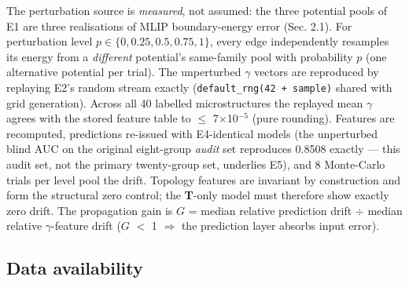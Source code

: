 \documentclass[11pt]{article}
\begin{document}
The perturbation source is \textit{measured}, not assumed: the three potential pools of E1 are three realisations of MLIP boundary-energy error (Sec. 2.1). For perturbation level $p \in \{0, 0.25, 0.5, 0.75, 1\}$, every edge independently resamples its energy from a \textit{different} potential's same-family pool with probability $p$ (one alternative potential per trial). The unperturbed $\gamma$ vectors are reproduced by replaying E2's random stream exactly (\texttt{default\_rng(42 + sample)} shared with grid generation). Across all 40 labelled microstructures the replayed mean $\gamma$ agrees with the stored feature table to $\le$ 7$\times$10$^{-5}$ (pure rounding). Features are recomputed, predictions re-issued with E4-identical models (the unperturbed blind AUC on the original eight-group \textit{audit} set reproduces 0.8508 exactly --- this audit set, not the primary twenty-group set, underlies E5), and 8 Monte-Carlo trials per level pool the drift. Topology features are invariant by construction and form the structural zero control; the \textbf{T}-only model must therefore show exactly zero drift. The propagation gain is $G$ = median relative prediction drift $\div$ median relative $\gamma$-feature drift ($G$ $<$ 1 $\Rightarrow$ the prediction layer absorbs input error).

\subsection*{Data availability}
\end{document}
